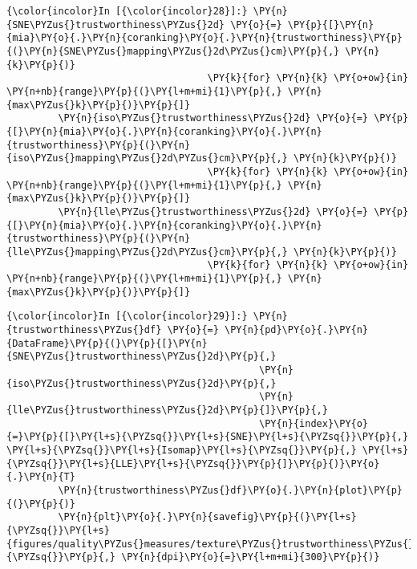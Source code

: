     \begin{Verbatim}[commandchars=\\\{\}]
{\color{incolor}In [{\color{incolor}28}]:} \PY{n}{SNE\PYZus{}trustworthiness\PYZus{}2d} \PY{o}{=} \PY{p}{[}\PY{n}{mia}\PY{o}{.}\PY{n}{coranking}\PY{o}{.}\PY{n}{trustworthiness}\PY{p}{(}\PY{n}{SNE\PYZus{}mapping\PYZus{}2d\PYZus{}cm}\PY{p}{,} \PY{n}{k}\PY{p}{)}
                                   \PY{k}{for} \PY{n}{k} \PY{o+ow}{in} \PY{n+nb}{range}\PY{p}{(}\PY{l+m+mi}{1}\PY{p}{,} \PY{n}{max\PYZus{}k}\PY{p}{)}\PY{p}{]}
         \PY{n}{iso\PYZus{}trustworthiness\PYZus{}2d} \PY{o}{=} \PY{p}{[}\PY{n}{mia}\PY{o}{.}\PY{n}{coranking}\PY{o}{.}\PY{n}{trustworthiness}\PY{p}{(}\PY{n}{iso\PYZus{}mapping\PYZus{}2d\PYZus{}cm}\PY{p}{,} \PY{n}{k}\PY{p}{)}
                                   \PY{k}{for} \PY{n}{k} \PY{o+ow}{in} \PY{n+nb}{range}\PY{p}{(}\PY{l+m+mi}{1}\PY{p}{,} \PY{n}{max\PYZus{}k}\PY{p}{)}\PY{p}{]}
         \PY{n}{lle\PYZus{}trustworthiness\PYZus{}2d} \PY{o}{=} \PY{p}{[}\PY{n}{mia}\PY{o}{.}\PY{n}{coranking}\PY{o}{.}\PY{n}{trustworthiness}\PY{p}{(}\PY{n}{lle\PYZus{}mapping\PYZus{}2d\PYZus{}cm}\PY{p}{,} \PY{n}{k}\PY{p}{)}
                                   \PY{k}{for} \PY{n}{k} \PY{o+ow}{in} \PY{n+nb}{range}\PY{p}{(}\PY{l+m+mi}{1}\PY{p}{,} \PY{n}{max\PYZus{}k}\PY{p}{)}\PY{p}{]}
\end{Verbatim}

    \begin{Verbatim}[commandchars=\\\{\}]
{\color{incolor}In [{\color{incolor}29}]:} \PY{n}{trustworthiness\PYZus{}df} \PY{o}{=} \PY{n}{pd}\PY{o}{.}\PY{n}{DataFrame}\PY{p}{(}\PY{p}{[}\PY{n}{SNE\PYZus{}trustworthiness\PYZus{}2d}\PY{p}{,}
                                            \PY{n}{iso\PYZus{}trustworthiness\PYZus{}2d}\PY{p}{,}
                                            \PY{n}{lle\PYZus{}trustworthiness\PYZus{}2d}\PY{p}{]}\PY{p}{,}
                                            \PY{n}{index}\PY{o}{=}\PY{p}{[}\PY{l+s}{\PYZsq{}}\PY{l+s}{SNE}\PY{l+s}{\PYZsq{}}\PY{p}{,} \PY{l+s}{\PYZsq{}}\PY{l+s}{Isomap}\PY{l+s}{\PYZsq{}}\PY{p}{,} \PY{l+s}{\PYZsq{}}\PY{l+s}{LLE}\PY{l+s}{\PYZsq{}}\PY{p}{]}\PY{p}{)}\PY{o}{.}\PY{n}{T}
         \PY{n}{trustworthiness\PYZus{}df}\PY{o}{.}\PY{n}{plot}\PY{p}{(}\PY{p}{)}
         \PY{n}{plt}\PY{o}{.}\PY{n}{savefig}\PY{p}{(}\PY{l+s}{\PYZsq{}}\PY{l+s}{figures/quality\PYZus{}measures/texture\PYZus{}trustworthiness\PYZus{}2d.png}\PY{l+s}{\PYZsq{}}\PY{p}{,} \PY{n}{dpi}\PY{o}{=}\PY{l+m+mi}{300}\PY{p}{)}
\end{Verbatim}

